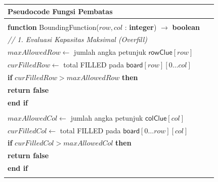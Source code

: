 \documentclass[conference]{IEEEtran}
\begin{document}
\begin{table}[H] 
\centering
\small 
\begin{tabular}{|p{0.95\linewidth}|} 
\hline
\textbf{Pseudocode Fungsi Pembatas} \\
\hline
\vspace{-0.5em} \\ 
\textbf{function} \textsf{BoundingFunction}($row, col$ : \textbf{integer}) $\rightarrow$ \textbf{boolean} \\
\quad \textit{// 1. Evaluasi Kapasitas Maksimal (Overfill)} \\
\quad $maxAllowedRow \leftarrow$ jumlah angka petunjuk $\textsf{rowClue}[row]$ \\
\quad $curFilledRow \leftarrow$ total \textsf{FILLED} pada $\textsf{board}[row][0 \dots col]$ \\
\quad \textbf{if} $curFilledRow > maxAllowedRow$ \textbf{then} \\
\quad \quad \textbf{return false} \\
\quad \textbf{end if} \\
\\
\quad $maxAllowedCol \leftarrow$ jumlah angka petunjuk $\textsf{colClue}[col]$ \\
\quad $curFilledCol \leftarrow$ total \textsf{FILLED} pada $\textsf{board}[0 \dots row][col]$ \\
\quad \textbf{if} $curFilledCol > maxAllowedCol$ \textbf{then} \\
\quad \quad \textbf{return false} \\
\quad \textbf{end if} \\
\vspace{-0.5em} \\
\hline
\end{tabular}
\end{table}
\end{document}
